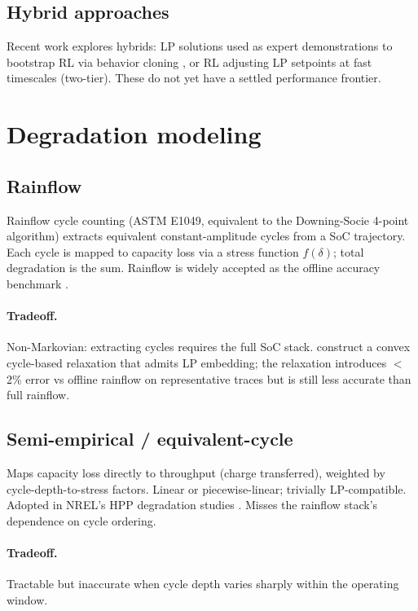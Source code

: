\documentclass[11pt]{article}
\begin{document}
\subsection{Hybrid approaches}

Recent work explores hybrids: LP solutions used as expert demonstrations to bootstrap RL via behavior cloning \citep{boosting2024lp}, or RL adjusting LP setpoints at fast timescales (two-tier). These do not yet have a settled performance frontier.

\section{Degradation modeling}

\subsection{Rainflow}

Rainflow cycle counting (ASTM E1049, equivalent to the Downing-Socie 4-point algorithm) extracts equivalent constant-amplitude cycles from a SoC trajectory. Each cycle is mapped to capacity loss via a stress function $f(\delta)$; total degradation is the sum. Rainflow is widely accepted as the offline accuracy benchmark \citep{xu2018modeling}.

\paragraph{Tradeoff.} Non-Markovian: extracting cycles requires the full SoC stack. \citet{shi2017convex} construct a convex cycle-based relaxation that admits LP embedding; the relaxation introduces \(<\)2\% error vs offline rainflow on representative traces but is still less accurate than full rainflow.

\subsection{Semi-empirical / equivalent-cycle}

Maps capacity loss directly to throughput (charge transferred), weighted by cycle-depth-to-stress factors. Linear or piecewise-linear; trivially LP-compatible. Adopted in NREL's HPP degradation studies \citep{nrel2025bessdeg}. Misses the rainflow stack's dependence on cycle ordering.

\paragraph{Tradeoff.} Tractable but inaccurate when cycle depth varies sharply within the operating window.
\end{document}
